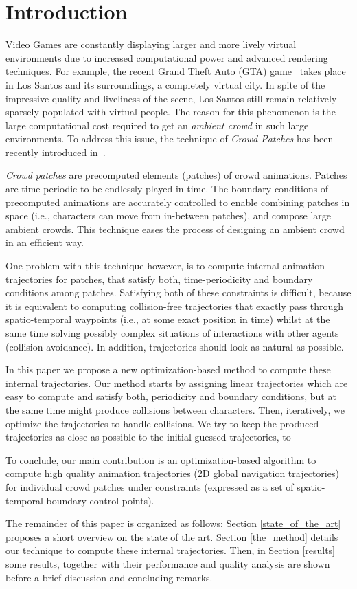 \section{Introduction}
\label{sec:intro}

Video Games are constantly displaying larger and more lively virtual environments due to increased computational power and advanced rendering techniques. For example, the recent Grand Theft Auto (GTA) game~\cite{GTA:web} takes place in Los Santos and its surroundings, a completely virtual city. In spite of the impressive quality and liveliness of the scene, Los Santos still remain relatively sparsely populated with virtual people. The reason for this phenomenon is the large computational cost required to get an {\it ambient crowd} in such large environments. To address this issue, the technique of {\it Crowd Patches} has been recently introduced in~\cite{Yersin:2009}. 

{\it Crowd patches} are precomputed elements (patches) of crowd animations. Patches are time-periodic to be endlessly played in time. The boundary conditions of precomputed animations are accurately controlled to enable combining patches in space (i.e., characters can move from in-between patches), and compose large ambient crowds. This technique eases the process of designing an ambient crowd in an efficient way. 

One problem with this technique however, is to compute internal animation trajectories for patches, that satisfy both, time-periodicity and boundary conditions among patches. Satisfying both of these constraints is difficult, because it is equivalent to computing collision-free trajectories that exactly pass through spatio-temporal waypoints (i.e., at some exact position in time) whilst at the same time solving possibly complex situations of interactions with other agents (collision-avoidance). In addition, trajectories should look as natural as possible.

In this paper we propose a new optimization-based method to compute these internal trajectories. Our method starts by assigning linear trajectories which are easy to compute and satisfy both, periodicity and boundary conditions, but at the same time might produce collisions between characters. Then, iteratively, we optimize the trajectories to handle collisions. We try to keep the produced trajectories as close as possible to the initial guessed trajectories, to   

To conclude, our main contribution is an optimization-based algorithm to compute high quality animation trajectories (2D global navigation trajectories) for individual crowd patches under constraints (expressed as a set of spatio-temporal boundary control points).

The remainder of this paper is organized as follows: Section \ref{state_of_the_art} proposes a short overview on the state of the art. Section \ref{the_method} details our technique to compute these internal trajectories. Then, in Section \ref{results} some results, together with their performance and quality analysis are shown before a brief discussion and concluding remarks. 
